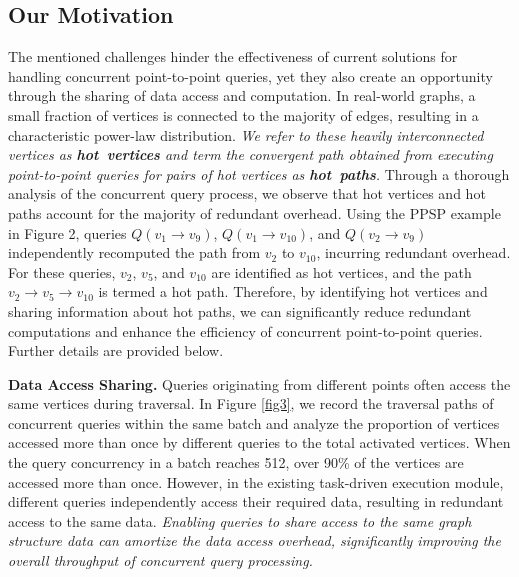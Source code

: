 \documentclass[10pt,journal,compsoc]{IEEEtran}
\begin{document}
\subsection{Our Motivation}\label{2.3}
The mentioned challenges hinder the effectiveness of current solutions for handling concurrent point-to-point queries, yet they also create an opportunity through the sharing of data access and computation.
In real-world graphs, a small fraction of vertices is connected to the majority of edges, resulting in a characteristic power-law distribution.
\textit{We refer to these heavily interconnected vertices as \textbf{\textit{hot~vertices}} and term the convergent path obtained from executing point-to-point queries for pairs of hot vertices as \textbf{\textit{hot~paths}}.}
Through a thorough analysis of the concurrent query process, we observe that hot vertices and hot paths account for the majority of redundant overhead.
Using the PPSP example in Figure 2, queries $Q(v_1\rightarrow v_{9})$, $Q(v_1\rightarrow v_{10})$, and $Q(v_2\rightarrow v_{9})$ independently recomputed the path from $v_2$ to $v_{10}$, incurring redundant overhead. For these queries, $v_2$, $v_5$, and $v_{10}$ are identified as hot vertices, and the path $v_2\rightarrow v_5\rightarrow v_{10}$ is termed a hot path.
Therefore, by identifying hot vertices and sharing information about hot paths, we can significantly reduce redundant computations and enhance the efficiency of concurrent point-to-point queries. Further details are provided below.

{\bf{Data Access Sharing.}}
Queries originating from different points often access the same vertices during traversal.
In Figure \ref{fig3}, we record the traversal paths of concurrent queries within the same batch and analyze the proportion of vertices accessed more than once by different queries to the total activated vertices. When the query concurrency in a batch reaches 512, over 90\% of the vertices are accessed more than once. However, in the existing task-driven execution module, different queries independently access their required data, resulting in redundant access to the same data. 
\textit{Enabling queries to share access to the same graph structure data can amortize the data access overhead, significantly improving the overall throughput of concurrent query processing.}
\end{document}
